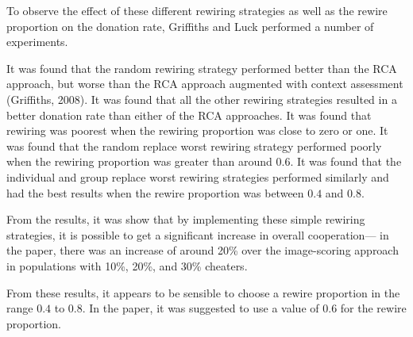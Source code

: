 To observe the effect of these different rewiring strategies as well as the
rewire proportion on the donation rate, Griffiths and Luck performed a number
of experiments.

It was found that the random rewiring strategy performed better than the RCA
approach, but worse than the RCA approach augmented with context assessment
(Griffiths, 2008). It was found that all the other rewiring strategies resulted
in a better donation rate than either of the RCA approaches. It was found that
rewiring was poorest when the rewiring proportion was close to zero or one.
It was found that the random replace worst rewiring strategy performed poorly
when the rewiring proportion was greater than around $0.6$. It was found that
the individual and group replace worst rewiring strategies performed similarly
and had the best results when the rewire proportion was between $0.4$ and $0.8$.

From the results, it was show that by implementing these simple rewiring
strategies, it is possible to get a significant increase in overall cooperation---
in the paper, there was an increase of around 20\% over the image-scoring approach
in populations with 10\%, 20\%, and 30\% cheaters.

From these results, it appears to be sensible to choose a rewire proportion in
the range $0.4$ to $0.8$. In the paper, it was suggested to use a value of $0.6$
for the rewire proportion.
